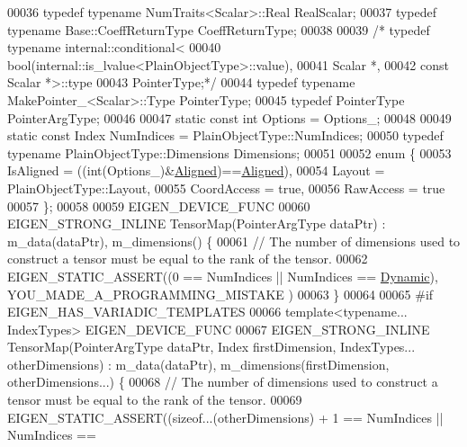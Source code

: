 \begin{DoxyCode}
00036     \textcolor{keyword}{typedef} \textcolor{keyword}{typename} NumTraits<Scalar>::Real RealScalar;
00037     \textcolor{keyword}{typedef} \textcolor{keyword}{typename} Base::CoeffReturnType CoeffReturnType;
00038 
00039   \textcolor{comment}{/*    typedef typename internal::conditional<}
00040 \textcolor{comment}{                         bool(internal::is\_lvalue<PlainObjectType>::value),}
00041 \textcolor{comment}{                         Scalar *,}
00042 \textcolor{comment}{                         const Scalar *>::type}
00043 \textcolor{comment}{                     PointerType;*/}
00044     \textcolor{keyword}{typedef} \textcolor{keyword}{typename} MakePointer\_<Scalar>::Type PointerType;
00045     \textcolor{keyword}{typedef} PointerType PointerArgType;
00046 
00047     \textcolor{keyword}{static} \textcolor{keyword}{const} \textcolor{keywordtype}{int} Options = Options\_;
00048 
00049     \textcolor{keyword}{static} \textcolor{keyword}{const} Index NumIndices = PlainObjectType::NumIndices;
00050     \textcolor{keyword}{typedef} \textcolor{keyword}{typename} PlainObjectType::Dimensions Dimensions;
00051 
00052     \textcolor{keyword}{enum} \{
00053       IsAligned = ((int(Options\_)&\hyperlink{group__enums_gga45fe06e29902b7a2773de05ba27b47a1ad37d4c71425bb286e9b4103830538fbf}{Aligned})==\hyperlink{group__enums_gga45fe06e29902b7a2773de05ba27b47a1ad37d4c71425bb286e9b4103830538fbf}{Aligned}),
00054       Layout = PlainObjectType::Layout,
00055       CoordAccess = \textcolor{keyword}{true},
00056       RawAccess = \textcolor{keyword}{true}
00057     \};
00058 
00059     EIGEN\_DEVICE\_FUNC
00060     EIGEN\_STRONG\_INLINE TensorMap(PointerArgType dataPtr) : m\_data(dataPtr), m\_dimensions() \{
00061       \textcolor{comment}{// The number of dimensions used to construct a tensor must be equal to the rank of the tensor.}
00062       EIGEN\_STATIC\_ASSERT((0 == NumIndices || NumIndices == \hyperlink{namespace_eigen_ad81fa7195215a0ce30017dfac309f0b2}{Dynamic}), YOU\_MADE\_A\_PROGRAMMING\_MISTAKE
      )
00063     \}
00064 
00065 \textcolor{preprocessor}{#if EIGEN\_HAS\_VARIADIC\_TEMPLATES}
00066     \textcolor{keyword}{template}<\textcolor{keyword}{typename}... IndexTypes> EIGEN\_DEVICE\_FUNC
00067     EIGEN\_STRONG\_INLINE TensorMap(PointerArgType dataPtr, Index firstDimension, IndexTypes... 
      otherDimensions) : m\_data(dataPtr), m\_dimensions(firstDimension, otherDimensions...) \{
00068       \textcolor{comment}{// The number of dimensions used to construct a tensor must be equal to the rank of the tensor.}
00069       EIGEN\_STATIC\_ASSERT((\textcolor{keyword}{sizeof}...(otherDimensions) + 1 == NumIndices || NumIndices == 

\end{DoxyCode}
